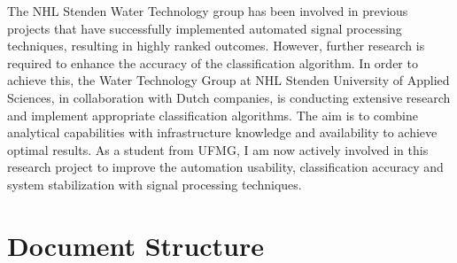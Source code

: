 The NHL Stenden Water Technology group has been involved in previous projects that have successfully implemented automated signal processing techniques, resulting in highly ranked outcomes. 
However, further research is required to enhance the accuracy of the classification algorithm. In order to achieve this, the Water Technology Group at NHL Stenden University of Applied Sciences, in collaboration with Dutch companies, is conducting extensive research and implement appropriate classification algorithms. The aim is to combine analytical capabilities with infrastructure knowledge and availability to achieve optimal results.
As a student from UFMG, I am now actively involved in this research project to improve the automation usability, classification accuracy and system stabilization with signal processing techniques.

\section{Document Structure}
\label{sec:doc_struct}

